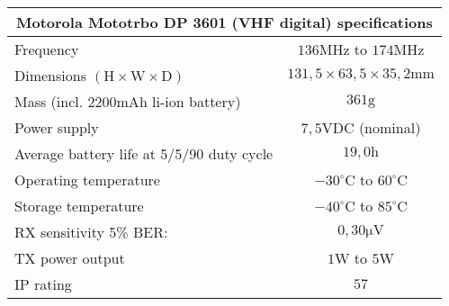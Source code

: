 \footnotesize
\begin{tabular}{|l|c|}
	\hline
	\multicolumn{2}{|c|}{\textbf{Motorola Mototrbo DP 3601 (VHF digital) specifications}} \\
	\hline
 	Frequency & $136\mathrm{MHz}$ to $174\mathrm{MHz}$ \\
 	Dimensions $\mathrm{(H \times W \times D)}$ & $131,5 \times 63,5 \times 35,2 \mathrm{mm}$ \\%
 	Mass (incl. $2200\mathrm{mAh}$ li-ion battery) & $361\mathrm{g}$ \\%
	Power supply & $7,5\mathrm{VDC}$ (nominal) \\
 	Average battery life at 5/5/90 duty cycle & $19,0\mathrm{h}$ \\
	Operating temperature & $-30^\circ \mathrm{C}$ to $60^\circ \mathrm{C}$ \\
	Storage temperature & $-40^\circ \mathrm{C}$ to $85^\circ \mathrm{C}$ \\
	RX sensitivity 5\% BER: & $0,30\mathrm{\mu V}$ \\
	TX power output & $1\mathrm{W}$ to $5\mathrm{W}$ \\
	IP rating & $57$\\
	\hline
\end{tabular}
